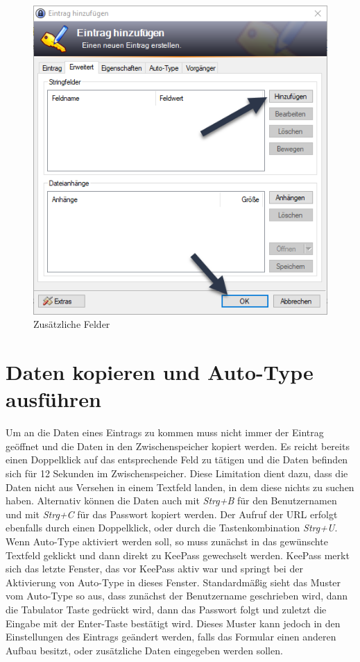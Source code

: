 \documentclass[12pt,a4paper]{scrreprt}
\begin{document}
\begin{figure}[h]
\begin{center}
\includegraphics[width=350pt]{media/knewentry4.png}
\caption{Zusätzliche Felder}
\label{knewentry4}
\end{center}
\end{figure}

\newpage

\section{Daten kopieren und Auto-Type ausführen}
Um an die Daten eines Eintrags zu kommen muss nicht immer der Eintrag geöffnet und die Daten in den Zwischenspeicher kopiert werden. Es reicht bereits einen Doppelklick auf das entsprechende Feld zu tätigen und die Daten befinden sich für 12 Sekunden im Zwischenspeicher. Diese Limitation dient dazu, dass die Daten nicht aus Versehen in einem Textfeld landen, in dem diese nichts zu suchen haben. Alternativ können die Daten auch mit \textit{Strg+B} für den Benutzernamen und mit \textit{Strg+C} für das Passwort kopiert werden. Der Aufruf der URL erfolgt ebenfalls durch einen Doppelklick, oder durch die Tastenkombination \textit{Strg+U}.\\

\noindent Wenn Auto-Type aktiviert werden soll, so muss zunächst in das gewünschte Textfeld geklickt und dann direkt zu KeePass gewechselt werden. KeePass merkt sich das letzte Fenster, das vor KeePass aktiv war und springt bei der Aktivierung von Auto-Type in dieses Fenster. Standardmäßig sieht das Muster vom Auto-Type so aus, dass zunächst der Benutzername geschrieben wird, dann die Tabulator Taste gedrückt wird, dann das Passwort folgt und zuletzt die Eingabe mit der Enter-Taste bestätigt wird. Dieses Muster kann jedoch in den Einstellungen des Eintrags geändert werden, falls das Formular einen anderen Aufbau besitzt, oder zusätzliche Daten eingegeben werden sollen.
\end{document}
